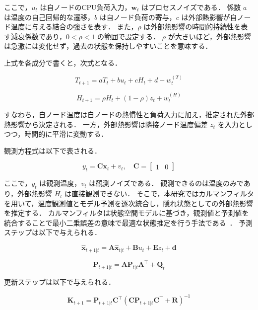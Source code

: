 \documentclass[techrep]{ipsj}
\begin{document}
ここで，$u_t$ は自ノードのCPU負荷入力，$\mathbf{w}_t$ はプロセスノイズである．
係数 $a$ は温度の自己回帰的な遷移，$b$ は自ノード負荷の寄与，$c$ は外部熱影響が自ノード温度に与える結合の強さを表す．
また，$\rho$ は外部熱影響の時間的持続性を表す減衰係数であり，$0<\rho<1$ の範囲で設定する．
$\rho$ が大きいほど，外部熱影響は急激には変化せず，過去の状態を保持しやすいことを意味する．

上式を各成分で書くと，次式となる．

\begin{equation}
T_{t+1}
=
aT_t + bu_t + cH_t + d + w_t^{(T)}
\end{equation}

\begin{equation}
H_{t+1}
=
\rho H_t + (1-\rho)z_t + w_t^{(H)}
\end{equation}

すなわち，自ノード温度は自ノードの熱慣性と負荷入力に加え，推定された外部熱影響から決定される．
一方，外部熱影響は隣接ノード温度偏差 $z_t$ を入力としつつ，時間的に平滑に変動する．

観測方程式は以下で表される．

\begin{equation}
y_t
=
\mathbf{C}\mathbf{x}_t + v_t,
\quad
\mathbf{C}
=
\begin{bmatrix}
1 & 0
\end{bmatrix}
\end{equation}

ここで，$y_t$ は観測温度，$v_t$ は観測ノイズである．
観測できるのは温度のみであり，外部熱影響 $H_t$ は直接観測できない．
そこで，本研究ではカルマンフィルタを用いて，温度観測値とモデル予測を逐次統合し，隠れ状態としての外部熱影響を推定する．
カルマンフィルタは状態空間モデルに基づき，観測値と予測値を統合することで最小二乗誤差の意味で最適な状態推定を行う手法である~\cite{kalman1960}．
予測ステップは以下で与えられる．

\begin{equation}
\hat{\mathbf{x}}_{t+1|t}
=
\mathbf{A}\hat{\mathbf{x}}_{t|t}
+
\mathbf{B}u_t
+
\mathbf{E}z_t
+
\mathbf{d}
\end{equation}

\begin{equation}
\mathbf{P}_{t+1|t}
=
\mathbf{A}\mathbf{P}_{t|t}\mathbf{A}^{\top}
+
\mathbf{Q}_t
\end{equation}

更新ステップは以下で与えられる．

\begin{equation}
\mathbf{K}_{t+1}
=
\mathbf{P}_{t+1|t}\mathbf{C}^{\top}
\left(
\mathbf{C}\mathbf{P}_{t+1|t}\mathbf{C}^{\top}
+
\mathbf{R}
\right)^{-1}
\end{equation}
\end{document}
